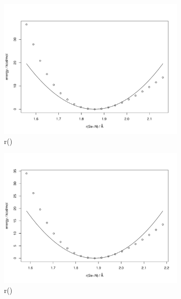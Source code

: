 \begin{refsection}
\begin{figure}
    \centering
    \begin{subfigure}{0.42\linewidth}
        \includegraphics[width=\linewidth]{Figures/ch2-sifig/SeN.pdf}
        \caption{r()}
    \end{subfigure}
    \begin{subfigure}{0.42\linewidth}
        \includegraphics[width=\linewidth]{Figures/ch2-sifig/SeC.pdf}
        \caption{r()}
    \end{subfigure}
    \begin{subfigure}{0.42\linewidth}

\end{subfigure}
\end{figure}
\end{refsection}
